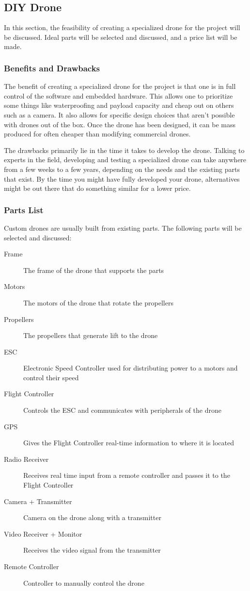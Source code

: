 \newpage
\subsection{DIY Drone}
In this section, the feasibility of creating a specialized drone for the project will be discussed. Ideal parts will be selected and discussed, and a price list will be made.

\subsubsection{Benefits and Drawbacks}
The benefit of creating a specialized drone for the project is that one is in full control of the software and embedded hardware. This allows one to prioritize some things like waterproofing and payload capacity and cheap out on others such as a camera. It also allows for specific design choices that aren't possible with drones out of the box. Once the drone has been designed, it can be mass produced for often cheaper than modifying commercial drones.

The drawbacks primarily lie in the time it takes to develop the drone. Talking to experts in the field, developing and testing a specialized drone can take anywhere from a few weeks to a few years, depending on the needs and the existing parts that exist. By the time you might have fully developed your drone, alternatives might be out there that do something similar for a lower price.

\subsubsection{Parts List}
Custom drones are usually built from existing parts. The following parts will be selected and discussed:
\begin{description}
   \item[Frame] The frame of the drone that supports the parts
   \item[Motors] The motors of the drone that rotate the propellers
   \item[Propellers] The propellers that generate lift to the drone
   \item[ESC] Electronic Speed Controller used for distributing power to a motors and control their speed
   \item[Flight Controller] Controls the ESC and communicates with peripherals of the drone
   \item[GPS] Gives the Flight Controller real-time information to where it is located
   \item[Radio Receiver] Receives real time input from a remote controller and passes it to the Flight Controller
   \item[Camera + Transmitter] Camera on the drone along with a transmitter
   \item[Video Receiver + Monitor] Receives the video signal from the transmitter
   \item[Remote Controller] Controller to manually control the drone
\end{description}

